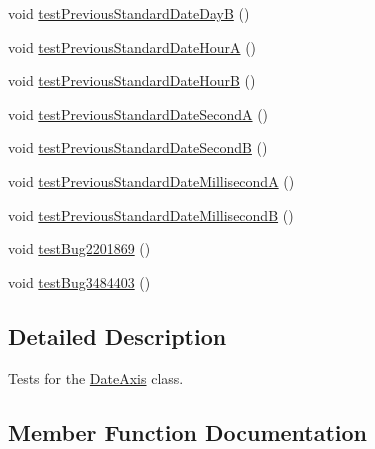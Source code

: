 \begin{DoxyCompactItemize}
\item 
void \mbox{\hyperlink{classorg_1_1jfree_1_1chart_1_1axis_1_1_date_axis_test_a8d957702115413aac07a0a8f41762555}{test\+Previous\+Standard\+Date\+DayB}} ()
\item 
void \mbox{\hyperlink{classorg_1_1jfree_1_1chart_1_1axis_1_1_date_axis_test_a4b4beeeb7f2d6cc994904c9051b1ee56}{test\+Previous\+Standard\+Date\+HourA}} ()
\item 
void \mbox{\hyperlink{classorg_1_1jfree_1_1chart_1_1axis_1_1_date_axis_test_afc489bc2d64f5ff5fa21b6a21c25d10c}{test\+Previous\+Standard\+Date\+HourB}} ()
\item 
void \mbox{\hyperlink{classorg_1_1jfree_1_1chart_1_1axis_1_1_date_axis_test_af7f953f84d92ff15a2fbc51fac46e71a}{test\+Previous\+Standard\+Date\+SecondA}} ()
\item 
void \mbox{\hyperlink{classorg_1_1jfree_1_1chart_1_1axis_1_1_date_axis_test_a2e86ab54f5c86a851c70c083de7d1091}{test\+Previous\+Standard\+Date\+SecondB}} ()
\item 
void \mbox{\hyperlink{classorg_1_1jfree_1_1chart_1_1axis_1_1_date_axis_test_a55e94171a78a0f1f6063faddb33e8b5c}{test\+Previous\+Standard\+Date\+MillisecondA}} ()
\item 
void \mbox{\hyperlink{classorg_1_1jfree_1_1chart_1_1axis_1_1_date_axis_test_a4f6c001457bf4c77e6484e9eaf7d179d}{test\+Previous\+Standard\+Date\+MillisecondB}} ()
\item 
void \mbox{\hyperlink{classorg_1_1jfree_1_1chart_1_1axis_1_1_date_axis_test_adfaa75513195d7d2a6a1367fb79f9e36}{test\+Bug2201869}} ()
\item 
void \mbox{\hyperlink{classorg_1_1jfree_1_1chart_1_1axis_1_1_date_axis_test_a86d5416e6bbf6c3feccf434ccbcf158d}{test\+Bug3484403}} ()
\end{DoxyCompactItemize}


\subsection{Detailed Description}
Tests for the \mbox{\hyperlink{classorg_1_1jfree_1_1chart_1_1axis_1_1_date_axis}{Date\+Axis}} class. 

\subsection{Member Function Documentation}
\mbox{\label{classorg_1_1jfree_1_1chart_1_1axis_1_1_date_axis_test_a4c3f12266deb3fce553b02aae0ea0687}} 
